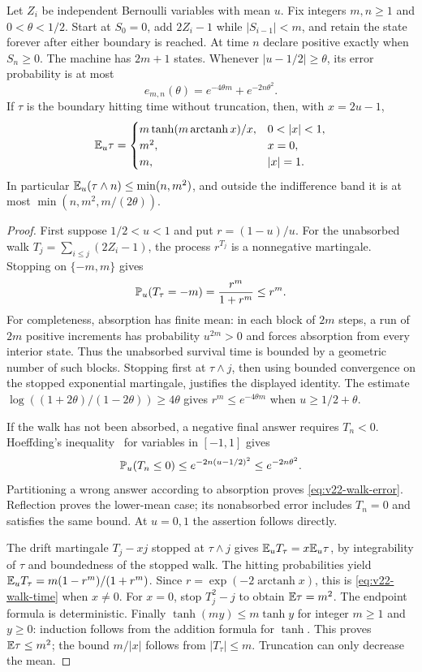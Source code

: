\begin{lemma}\label{lem:v22-walk}
Let $Z_i$ be independent Bernoulli variables with mean $u$. Fix integers
$m,n\ge1$ and $0<\theta<1/2$. Start at $S_0=0$, add $2Z_i-1$
while $|S_{i-1}|<m$, and retain the state forever after either boundary
is reached. At time $n$ declare positive exactly when $S_n\ge0$.
The machine has $2m+1$ states. Whenever $|u-1/2|\ge\theta$, its error
probability is at most
\begin{equation}\label{eq:v22-walk-error}
 e_{m,n}(\theta)=e^{-4\theta m}+e^{-2n\theta^2}.
\end{equation}
If $\tau$ is the boundary hitting time without truncation, then, with
$x=2u-1$,
\begin{equation}\label{eq:v22-walk-time}
 \E_u\tau=
 \begin{cases}
 m\tanh(m\operatorname{arctanh}x)/x,&0<|x|<1,\\
 m^2,&x=0,\\
 m,&|x|=1.
 \end{cases}
\end{equation}
In particular $\mathbb E_u(\tau\wedge n)\le\min(n,m^2)$, and outside the
indifference band it is at most $\min(n,m^2,m/(2\theta))$.
\end{lemma}
\begin{proof}
First suppose $1/2<u<1$ and put $r=(1-u)/u$. For the unabsorbed walk
$T_j=\sum_{i\le j}(2Z_i-1)$, the process $r^{T_j}$ is a nonnegative
martingale. Stopping on $\{-m,m\}$ gives
\[
 \mathbb P_u(T_\tau=-m)=\frac{r^m}{1+r^m}\le r^m.
\]
For completeness, absorption has finite mean: in each block of $2m$
steps, a run of $2m$ positive increments has probability $u^{2m}>0$
and forces absorption from every interior state. Thus the unabsorbed
survival time is bounded by a geometric number of such blocks. Stopping
first at $\tau\wedge j$, then using bounded convergence on the stopped
exponential martingale, justifies the displayed identity. The estimate
$\log((1+2\theta)/(1-2\theta))\ge4\theta$ gives
$r^m\le e^{-4\theta m}$ when $u\ge1/2+\theta$.

If the walk has not been absorbed, a negative final answer requires
$T_n<0$. Hoeffding's inequality~\cite{Hoeffding1963} for variables in $[-1,1]$ gives
\[
 \mathbb P_u(T_n\le0)\le e^{-2n(u-1/2)^2}\le e^{-2n\theta^2}.
\]
Partitioning a wrong answer according to absorption proves
\eqref{eq:v22-walk-error}. Reflection proves the lower-mean case; its
nonabsorbed error includes $T_n=0$ and satisfies the same bound. At
$u=0,1$ the assertion follows directly.

The drift martingale $T_j-xj$ stopped at $\tau\wedge j$ gives
$\mathbb E_u T_\tau=x\mathbb E_u\tau$, by integrability of $\tau$ and boundedness
of the stopped walk. The hitting probabilities yield
$\mathbb E_u T_\tau=m(1-r^m)/(1+r^m)$. Since
$r=\exp(-2\operatorname{arctanh}x)$, this is \eqref{eq:v22-walk-time}
when $x\ne0$. For $x=0$, stop $T_j^2-j$ to obtain $\mathbb E\tau=m^2$.
The endpoint formula is deterministic. Finally
$\tanh(my)\le m\tanh y$ for integer $m\ge1$ and $y\ge0$:
induction follows from the addition formula for $\tanh$. This proves
$\mathbb E\tau\le m^2$; the bound $m/|x|$ follows from $|T_\tau|\le m$.
Truncation can only decrease the mean.
\end{proof}

